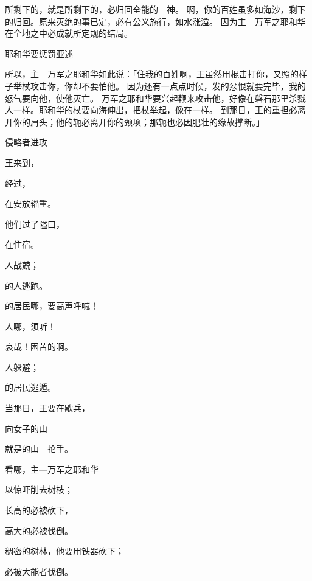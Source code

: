 {所剩下的，就是{}{}所剩下的，必归回全能的　神。
啊，你的百姓虽多如海沙，{}剩下的归回。原来灭绝的事已定，必有公义施行，如水涨溢。
因为主—万军之耶和华在全地之中必成就所定规的结局。
\par }{\SH 耶和华要惩罚亚述
\par }{\PP {}所以，主—万军之耶和华如此说：「住{}我的百姓啊，{}王虽然用棍击打你，又照{}的样子举杖攻击你，你却不要怕他。
因为还有一点点时候，{}发的忿恨就要完毕，我的怒气要向他{}，使他灭亡。
万军之耶和华要兴起鞭来攻击他，好像在{}磐石那里杀戮{}人一样。耶和华的杖要向海伸出，把杖举起，像在{}一样。
到那日，{}王的重担必离开你的肩头；他的轭必离开你的颈项；那轭也必因肥壮的缘故撑断。」
\par }{\SH 侵略者进攻
\par }{\Q {}王来到{}，
\par }{\Q 经过{}，
\par }{\Q 在{}安放辎重。
\par }{\Q {}他们过了隘口，
\par }{\Q 在{}住宿。
\par }{人战兢；
\par }{的{}人逃跑。
\par }{\Q {}的居民哪，要高声呼喊！
\par }{人哪，须听！
\par }{\Q 哀哉！困苦的{}啊。
\par }{\Q {}人躲避；
\par }{的居民逃遁。
\par }{\Q {}当那日，{}王要在{}歇兵，
\par }{\Q 向{}女子的山—
\par }{\Q 就是{}的山—抡手{}。
\par }{\BB \par }{\Q {}看哪，主—万军之耶和华
\par }{\Q 以惊吓削去树枝；
\par }{\Q 长高的必被砍下，
\par }{\Q 高大的必被伐倒。
\par }{\Q {}稠密的树林，他要用铁器砍下；
\par }{必被大能者伐倒。

}
